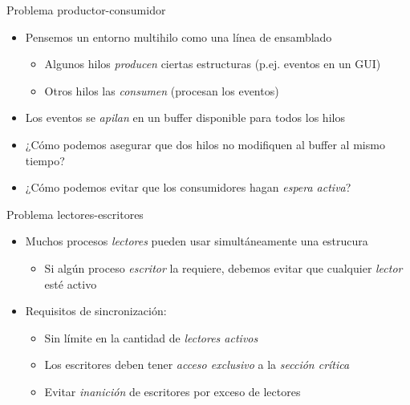 \documentclass[presentation]{beamer}
\begin{document}
\begin{frame}[label={sec:orgc9c0cc0}]{Problema productor-consumidor}
\begin{itemize}
\item Pensemos un entorno multihilo como una línea de ensamblado
\begin{itemize}
\item Algunos hilos \emph{producen} ciertas estructuras (p.ej. eventos en un
GUI)
\item Otros hilos las \emph{consumen} (procesan los eventos)
\end{itemize}
\item Los eventos se \emph{apilan} en un buffer disponible para todos los hilos
\item ¿Cómo podemos asegurar que dos hilos no modifiquen al buffer al
mismo tiempo?
\item ¿Cómo podemos evitar que los consumidores hagan \emph{espera activa}?
\end{itemize}
\end{frame}

\begin{frame}[label={sec:orgc43a85a}]{Problema lectores-escritores}
\begin{itemize}
\item Muchos procesos \emph{lectores} pueden usar simultáneamente una estrucura
\begin{itemize}
\item Si algún proceso \emph{escritor} la requiere, debemos evitar que
cualquier \emph{lector} esté activo
\end{itemize}
\item Requisitos de sincronización:
\begin{itemize}
\item Sin límite en la cantidad de \emph{lectores activos}
\item Los escritores deben tener \emph{acceso exclusivo} a la \emph{sección crítica}
\item Evitar \emph{inanición} de escritores por exceso de lectores
\end{itemize}
\end{itemize}
\end{frame}
\end{document}
